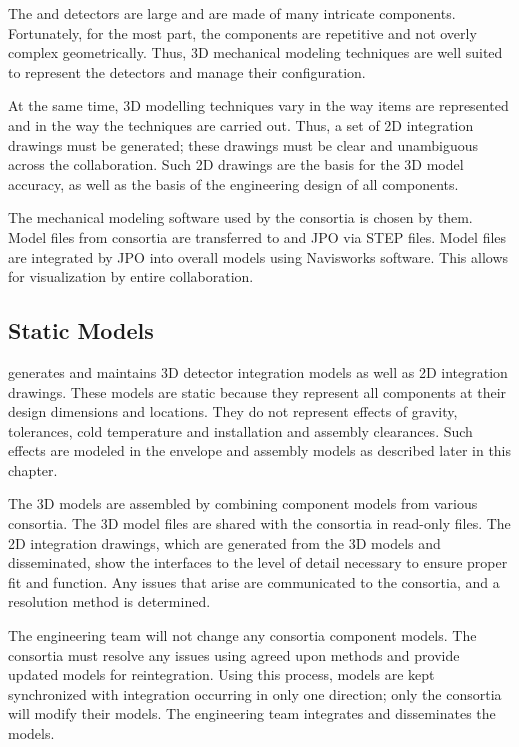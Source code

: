 The  and  detectors are large and are made of many
intricate components. Fortunately, for the most part, the
components are repetitive and not overly complex
geometrically. Thus, 3D mechanical modeling techniques are well suited
to represent the detectors and manage their configuration.

At the same time, 3D modelling techniques vary in the way items are
represented and in the way the techniques are carried out. Thus, a set
of 2D integration drawings must be generated; these drawings must be
clear and unambiguous across the collaboration. Such 2D drawings are
the basis for the 3D model accuracy, as well as the basis of the engineering
design of all components.

The mechanical modeling software used by the consortia is chosen by
them. Model files from consortia are transferred to  and JPO
via STEP files. Model files are integrated by JPO into overall models
using Navisworks software. This allows for visualization by entire
collaboration.

\subsection{Static Models}
\label{sec:fdsp-coord-integ-static}

 generates and maintains 3D detector integration models as
well as 2D integration drawings. These models are static because they
represent all components at their design dimensions and
locations. They do not represent effects of gravity, tolerances, cold
temperature and installation and assembly clearances. Such effects are
modeled in the envelope and assembly models as described later in this
chapter.


The 3D models are assembled by combining component models from various
consortia. The 3D model files are shared with the consortia in
read-only files. The 2D integration drawings, which are generated from
the 3D models and disseminated, show the interfaces to the level of
detail necessary to ensure proper fit and function. Any issues that
arise are communicated to the consortia, and a resolution method is
determined. 

The  engineering team will not change any consortia
component models.  The consortia must resolve any issues using agreed
upon methods and provide updated models for reintegration. Using this
process, models are kept synchronized with integration occurring in
only one direction; only the consortia will modify their models. The
 engineering team integrates and disseminates the models.


